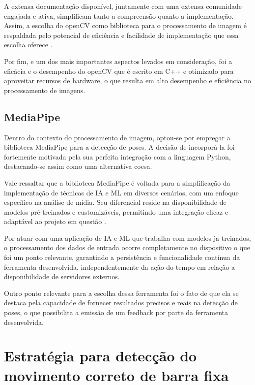 A extensa documentação disponível, juntamente com uma extensa comunidade engajada e ativa, simplificam tanto a compreensão quanto a implementação. Assim, a escolha do \ac{openCV} como biblioteca para o processamento de imagem é respaldada pelo potencial de eficiência e facilidade de implementação que essa escolha oferece \cite{opencv_docs}.

Por fim, e um dos mais importantes aspectos levados em consideração, foi a eficácia e o desempenho do \ac{openCV} que é escrito em C++ e otimizado para aproveitar recursos de hardware, o que resulta em alto desempenho e eficiência no processamento de imagens.

\subsection{MediaPipe}

Dentro do contexto do processamento de imagem, optou-se por empregar a biblioteca MediaPipe para a detecção de poses. A decisão de incorporá-la foi fortemente motivada pela sua perfeita integração com a linguagem Python, destacando-se assim como uma alternativa coesa.

Vale ressaltar que a biblioteca MediaPipe é voltada para a simplificação da implementação de técnicas de \ac{IA} e \ac{ML} em diversos cenários, com um enfoque específico na análise de mídia. Seu diferencial reside na disponibilidade de modelos pré-treinados e customizáveis, permitindo uma integração eficaz e adaptável ao projeto em questão \cite{mediapipe_guide}.

Por atuar com uma aplicação de \ac{IA} e \ac{ML} que trabalha com modelos ja treinados, o processamento dos dados de entrada ocorre completamente no dispositivo o que foi um ponto relevante, garantindo a persistência e funcionalidade contínua da ferramenta desenvolvida, independentemente da ação do tempo em relação a disponibilidade de servidores externos.

Outro ponto relevante para a escolha dessa ferramenta foi o fato de que ela se destaca pela capacidade de fornecer resultados precisos e reais na detecção de poses, o que possibilita a emissão de um feedback por parte da ferramenta desenvolvida.




\section[Estratégia para detecção do movimento correto de barra fixa]{Estratégia para detecção do movimento correto de barra fixa}\label{sec:Estrategia para deteccao do movimento correto de barra fixa}


